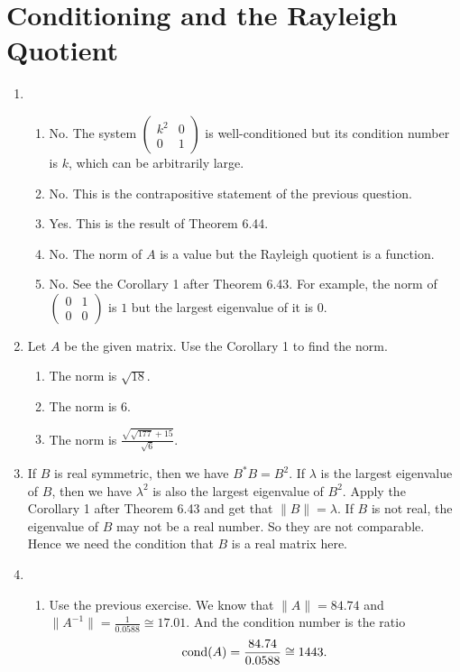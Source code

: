 \section{Conditioning and the Rayleigh Quotient}
\begin{enumerate}
\item \begin{enumerate}
\item No. The system $\begin{pmatrix}k^2&0\\0&1\end{pmatrix}$ is well-conditioned but its condition number is $k$, which can be arbitrarily large.
\item No. This is the contrapositive statement of the previous question.
\item Yes. This is the result of Theorem 6.44.
\item No. The norm of $A$ is a value but the Rayleigh quotient is a function.
\item No. See the Corollary 1 after Theorem 6.43. For example, the norm of $\begin{pmatrix}0&1\\0&0\end{pmatrix}$ is $1$ but the largest eigenvalue of it is $0$.
\end{enumerate}
\item Let $A$ be the given matrix. Use the Corollary 1 to find the norm.
\begin{enumerate}
\item The norm is $\sqrt{18}$.
\item The norm is $6$.
\item The norm is $\frac{\sqrt{\sqrt{177}+15}}{\sqrt{6}}$.
\end{enumerate}
\item If $B$ is real symmetric, then we have $B^*B=B^2$. If $\lambda$ is the largest eigenvalue of $B$, then we have $\lambda^2$ is also the largest eigenvalue of $B^2$. Apply the Corollary 1 after Theorem 6.43 and get that $\|B\|=\lambda$. If $B$ is not real, the eigenvalue of $B$ may not be a real number. So they are not comparable. Hence we need the condition that $B$ is a real matrix here.
\item \begin{enumerate}
\item Use the previous exercise. We know that $\|A\|=84.74$ and $\|A^{-1}\|=\frac{1}{0.0588}\cong 17.01$. And the condition number is the ratio 
\[\operatorname{cond}(A)=\frac{84.74}{0.0588}\cong 1443.\]

\end{enumerate}
\end{enumerate}
